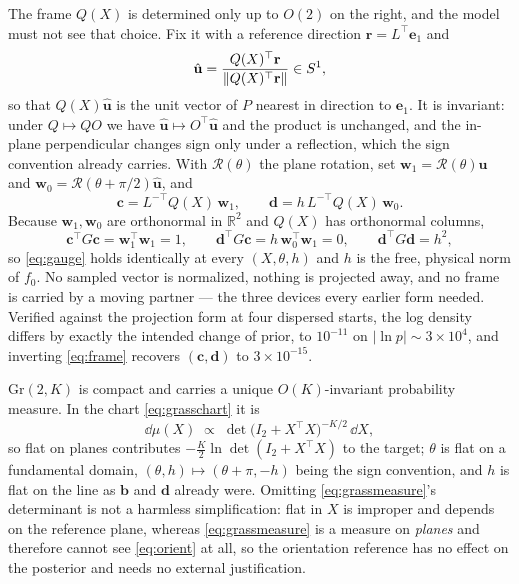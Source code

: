 \documentclass[11pt]{article}
\theoremstyle{plain}
\begin{document}
The frame $Q(X)$ is determined only up to $O(2)$ on the right, and the model must not see
that choice. Fix it with a reference direction $\mathbf{r} = L^{\top}\mathbf{e}_{1}$ and
\begin{equation}
  \hat{\mathbf{u}} = \frac{Q(X)^{\top}\mathbf{r}}{\left\| Q(X)^{\top}\mathbf{r} \right\|} \in S^{1} ,
  \label{eq:orient}
\end{equation}
so that $Q(X)\hat{\mathbf{u}}$ is the unit vector of $P$ nearest in direction to
$\mathbf{e}_{1}$. It is invariant: under $Q \mapsto QO$ we have
$\hat{\mathbf{u}} \mapsto O^{\top}\hat{\mathbf{u}}$ and the product is unchanged, and the
in-plane perpendicular changes sign only under a reflection, which the sign convention
already carries. With $\mathcal{R}(\theta)$ the plane rotation, set
$\mathbf{w}_{1} = \mathcal{R}(\theta)\hat{\mathbf{u}}$ and
$\mathbf{w}_{0} = \mathcal{R}(\theta + \pi/2)\hat{\mathbf{u}}$, and
\begin{equation}
  \mathbf{c} = L^{-\top} Q(X)\,\mathbf{w}_{1} , \qquad
  \mathbf{d} = h\, L^{-\top} Q(X)\,\mathbf{w}_{0} .
  \label{eq:frame}
\end{equation}
Because $\mathbf{w}_{1}, \mathbf{w}_{0}$ are orthonormal in $\mathbb{R}^{2}$ and
$Q(X)$ has orthonormal columns,
\begin{equation}
  \mathbf{c}^{\top}G\mathbf{c} = \mathbf{w}_{1}^{\top}\mathbf{w}_{1} = 1 , \qquad
  \mathbf{d}^{\top}G\mathbf{c} = h\,\mathbf{w}_{0}^{\top}\mathbf{w}_{1} = 0 , \qquad
  \mathbf{d}^{\top}G\mathbf{d} = h^{2} ,
  \label{eq:gaugeid}
\end{equation}
so \eqref{eq:gauge} holds identically at every $(X, \theta, h)$ and $h$ is the free,
physical norm of $f_{0}$. No sampled vector is normalized, nothing is projected away, and no
frame is carried by a moving partner --- the three devices every earlier form needed.
Verified against the projection form at four dispersed starts, the log density differs by
exactly the intended change of prior, to $10^{-11}$ on $\lvert \ln p\rvert \sim 3\times10^{4}$,
and inverting \eqref{eq:frame} recovers $(\mathbf{c}, \mathbf{d})$ to $3\times10^{-15}$.

$\mathrm{Gr}(2,K)$ is compact and carries a unique $O(K)$-invariant probability measure. In
the chart \eqref{eq:grasschart} it is
\begin{equation}
  \dd\mu(X) \;\propto\; \det\bigl(I_{2} + X^{\top}X\bigr)^{-K/2}\,\dd X ,
  \label{eq:grassmeasure}
\end{equation}
so flat on planes contributes $-\tfrac{K}{2}\ln\det(I_{2} + X^{\top}X)$ to the target;
$\theta$ is flat on a fundamental domain, $(\theta, h) \mapsto (\theta + \pi, -h)$ being the
sign convention, and $h$ is flat on the line as $\mathbf{b}$ and $\mathbf{d}$ already were.
Omitting \eqref{eq:grassmeasure}'s determinant is not a harmless simplification: flat in $X$
is improper and depends on the reference plane, whereas \eqref{eq:grassmeasure} is a measure
on \emph{planes} and therefore cannot see \eqref{eq:orient} at all, so the orientation
reference has no effect on the posterior and needs no external justification.
\end{document}
